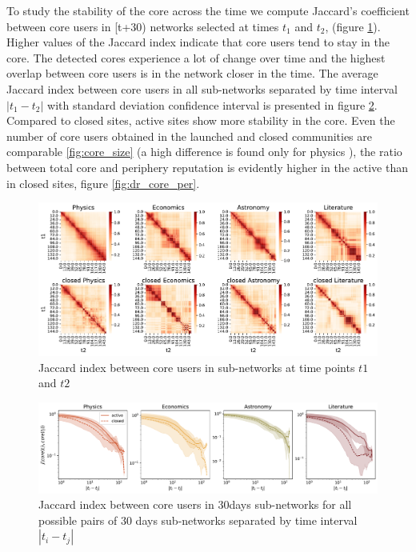 To study the stability of the core across the time we compute Jaccard’s coefficient between core users in [t+30) networks selected at times $t_1$ and $t_2$, (figure \ref{fig:jaccard_hm}). Higher values of the Jaccard index indicate that core users tend to stay in the core. The detected cores experience a lot of change over time and the highest overlap between core users is in the network closer in the time. The average Jaccard index between core users in all sub-networks separated by time interval $|t_1 - t_2|$ with standard deviation confidence interval is presented in figure \ref{fig:jaccard_mean}. Compared to closed sites, active sites show more stability in the core. Even the number of core users obtained in the launched and closed communities are comparable \ref{fig:core_size} (a high difference is found only for physics ), the ratio between total core and periphery reputation is evidently higher in the active than in closed sites, figure \ref{fig:dr_core_per}.  

\begin{figure}[h!]
	\centering
	\includegraphics[width=\linewidth]{figures/stackexchange/jaccard_heatmap.pdf}
	\caption{Jaccard index between core users in  sub-networks at time points $t1$ and $t2$}
	\label{fig:jaccard_hm}
\end{figure}

\begin{figure}[h!]
	\centering
	\includegraphics[width=\linewidth]{figures/stackexchange/jaccard.pdf}
	\caption{Jaccard index between core users in 30days sub-networks for all possible pairs of 30 days sub-networks separated by time interval $|t_i - t_j|$}
	\label{fig:jaccard_mean}
\end{figure}


